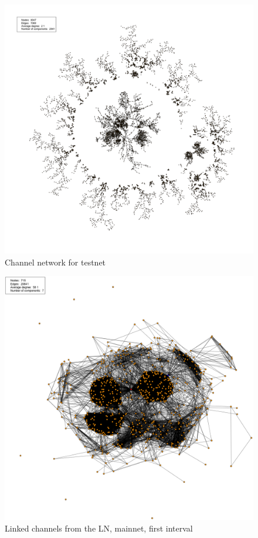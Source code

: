 \begin{figure}[ht]
    \centering
    \includegraphics[width=14cm]{figures/graphs/cg_bc_testnet_full.png}
    \caption{Channel network for testnet}
    \label{fig:cg_testnet_full}
\end{figure}

\begin{figure}[ht]
    \centering
    \includegraphics[width=14cm]{figures/graphs/cg_ln_mainnet_run1.png}
    \caption{Linked channels from the LN, mainnet, first interval}
    \label{fig:channel_network_LN_mainent}
\end{figure}

